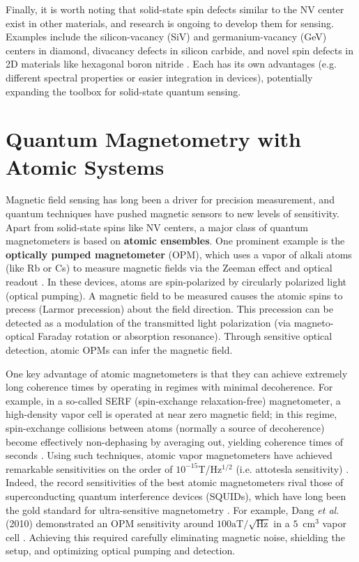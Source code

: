 Finally, it is worth noting that solid-state spin defects similar to
the NV center exist in other materials, and research is ongoing to
develop them for sensing. Examples include the silicon-vacancy (SiV)
and germanium-vacancy (GeV) centers in diamond, divacancy defects in
silicon carbide, and novel spin defects in 2D materials like hexagonal
boron nitride . Each has its own advantages (e.g. different spectral
properties or easier integration in devices), potentially expanding
the toolbox for solid-state quantum sensing.



\section{Quantum Magnetometry with Atomic Systems}\label{sec:magnetometry}

Magnetic field sensing has long been a driver for precision
measurement, and quantum techniques have pushed magnetic sensors to
new levels of sensitivity. Apart from solid-state spins like NV
centers, a major class of quantum magnetometers is based on
\textbf{atomic ensembles}. One prominent example is the
\textbf{optically pumped magnetometer} (OPM), which uses a vapor of
alkali atoms (like Rb or Cs) to measure magnetic fields via the Zeeman
effect and optical readout . In these devices, atoms are
spin-polarized by circularly polarized light (optical pumping). A
magnetic field to be measured causes the atomic spins to precess
(Larmor precession) about the field direction. This precession can be
detected as a modulation of the transmitted light polarization (via
magneto-optical Faraday rotation or absorption resonance). Through
sensitive optical detection, atomic OPMs can infer the magnetic field.



One key advantage of atomic magnetometers is that they can achieve
extremely long coherence times by operating in regimes with minimal
decoherence. For example, in a so-called SERF (spin-exchange
relaxation-free) magnetometer, a high-density vapor cell is operated
at near zero magnetic field; in this regime, spin-exchange collisions
between atoms (normally a source of decoherence) become effectively
non-dephasing by averaging out, yielding coherence times of seconds
. Using such techniques, atomic vapor magnetometers have achieved
remarkable sensitivities on the order of $10^{-15}$T/Hz$^{1/2}$
(i.e. attotesla sensitivity) . Indeed, the record sensitivities of the
best atomic magnetometers rival those of superconducting quantum
interference devices (SQUIDs), which have long been the gold standard
for ultra-sensitive magnetometry . For example, Dang \emph{et al.}
(2010) demonstrated an OPM sensitivity around
$100\text{aT}/\sqrt{\text{Hz}}$ in a $5$~cm$^3$ vapor cell . Achieving
this required carefully eliminating magnetic noise, shielding the
setup, and optimizing optical pumping and detection.



